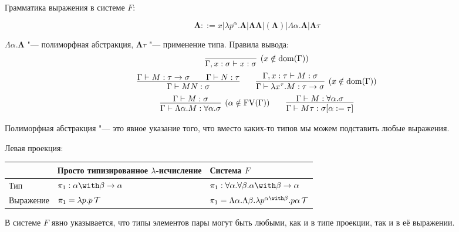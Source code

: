 \begin{definition}[система $F$]
Грамматика выражения в системе $F$:
    \begin{bnf}
    \[
        \mathbf\Lambda ::= x | \lambda p^\alpha . \mathbf\Lambda | \mathbf\Lambda \mathbf\Lambda | (\mathbf\Lambda)
        | \Lambda \alpha . \mathbf\Lambda | \mathbf\Lambda \tau
    \]
    \end{bnf}%
    $\Lambda \alpha . \mathbf\Lambda$ "--- полиморфная абстракция, $\mathbf\Lambda \tau$ "--- применение типа.
    Правила вывода:
    \inferspacing
    \begin{gather*}
        \infer[(x \notin \mathrm{dom}(\Gamma))]{\Gamma, x : \sigma \vdash x : \sigma}{} \\
        \infer{\Gamma \vdash MN : \sigma}{\Gamma \vdash M : \tau \to \sigma && \Gamma \vdash N : \tau} \qquad
        \infer[(x \notin \mathrm{dom}(\Gamma))]
                {\Gamma \vdash \lambda x^\tau . M : \tau \to \sigma}{\Gamma, x : \tau \vdash M : \sigma} \\
        \infer[(\alpha \notin \FV(\Gamma))]{\Gamma \vdash \Lambda \alpha . M : \forall \alpha . \sigma}{\Gamma \vdash M : \sigma} \qquad
        \infer{\Gamma \vdash M \tau : \sigma [\alpha := \tau]}{\Gamma \vdash M : \forall \alpha . \sigma}
    \end{gather*}
\end{definition}

Полиморфная абстракция "--- это явное указание того, что вместо каких-то типов мы можем подставить любые выражения.

\begin{example} Левая проекция:
    \begin{center}
    \begin{tabular}{l l l} \toprule
        & Просто типизированное $\lambda$-исчисление & Система $F$ \\ \midrule
        Тип & $\pi_1:\alpha\with\beta\to\alpha$ & $\pi_1:\forall \alpha . \forall \beta . \alpha \with \beta \to \alpha$ \\
        Выражение & $\pi_1 = \lambda p . p \operatorname{\mathcal{T}}$ & $\pi_1 = \Lambda \alpha . \Lambda \beta . \lambda p^{\alpha\with\beta} .
                p \alpha \comb T$
        \\ \bottomrule
    \end{tabular}
    \end{center}
В системе $F$ явно указывается, что типы элементов пары могут быть любыми, как и в типе проекции, так и в её выражении.
\end{example}

